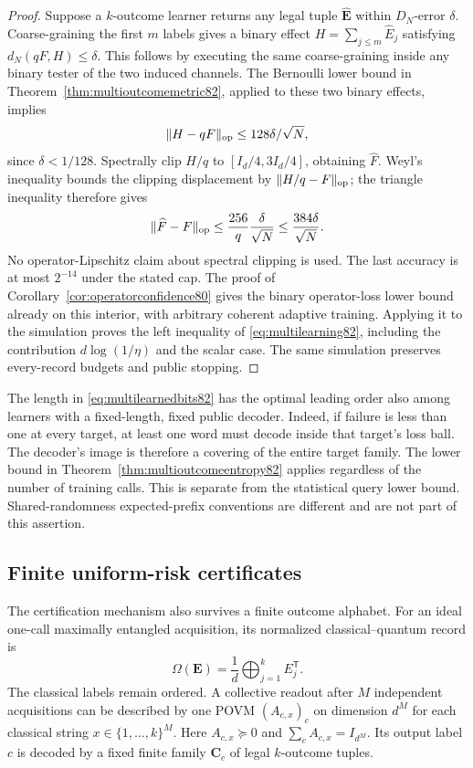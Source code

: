 \begin{proof}
Suppose a $k$-outcome learner returns any legal tuple
$\widehat{\boldsymbol E}$ within $D_N$-error $\delta$.
Coarse-graining the first $m$ labels gives a binary effect
$H=\sum_{j\le m}\widehat E_j$ satisfying
$d_N(qF,H)\le\delta$.  This follows by executing the same
coarse-graining inside any binary tester of the two induced channels.
The Bernoulli lower bound in
Theorem~\ref{thm:multioutcomemetric82}, applied to these two binary
effects, implies
\[
 \|H-qF\|_{\rm op}\le128\delta/\sqrt N,
\]
since $\delta<1/128$.
Spectrally clip $H/q$ to $[I_d/4,3I_d/4]$, obtaining $\widehat F$.
Weyl's inequality bounds the clipping displacement by
$\|H/q-F\|_{\rm op}$; the triangle inequality therefore gives
\[
 \|\widehat F-F\|_{\rm op}
      \le\frac{256}{q}\frac\delta{\sqrt N}
      \le\frac{384\delta}{\sqrt N}.
\]
No operator-Lipschitz claim about spectral clipping is used.
The last accuracy is at most $2^{-14}$ under the stated cap.
The proof of Corollary~\ref{cor:operatorconfidence80} gives the
binary operator-loss lower bound already on this interior, with
arbitrary coherent adaptive training.  Applying it to the simulation
proves the left inequality of \eqref{eq:multilearning82}, including
the contribution $d\log(1/\eta)$ and the scalar case.  The same
simulation preserves every-record budgets and public stopping.
\end{proof}

The length in \eqref{eq:multilearnedbits82} has the optimal leading
order also among learners with a fixed-length, fixed public decoder.
Indeed, if failure is less than one at every target, at least one
word must decode inside that target's loss ball.  The decoder's
image is therefore a covering of the entire target family.
The lower bound in Theorem~\ref{thm:multioutcomeentropy82} applies
regardless of the number of training calls.  This is separate from
the statistical query lower bound.  Shared-randomness expected-prefix
conventions are different and are not part of this assertion.

\subsection{Finite uniform-risk certificates}
The certification mechanism also survives a finite outcome alphabet.
For an ideal one-call maximally entangled acquisition, its normalized
classical--quantum record is
\begin{equation}\label{eq:multichoi82}
 \Omega(\boldsymbol E)=\frac1d\bigoplus_{j=1}^k E_j^{\mathsf T}.
\end{equation}
The classical labels remain ordered.  A collective readout after $M$
independent acquisitions can be described by one POVM
$(A_{c,x})_c$ on dimension $d^M$ for each classical string
$x\in\{1,\ldots,k\}^M$.  Here $A_{c,x}\succeq0$ and
$\sum_c A_{c,x}=I_{d^M}$.  Its output label $c$ is decoded by a
fixed finite family $\boldsymbol C_c$ of legal $k$-outcome tuples.

